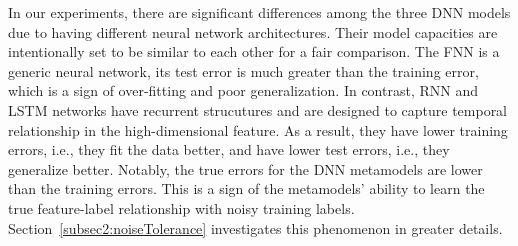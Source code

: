 In our experiments, there are significant differences among the three DNN models due to having different neural network architectures.
Their model capacities are intentionally set to be similar to each other for a fair comparison.
The FNN is a generic neural network, its test error is much greater than the training error, which is a sign of over-fitting and poor generalization.
In contrast, RNN and LSTM networks have recurrent strucutures and are designed to capture temporal relationship in the high-dimensional feature.
As a result, they have lower training errors, i.e., they fit the data better, and have lower test errors, i.e., they generalize better.
Notably, the true errors for the DNN metamodels are lower than the training errors.
This is a sign of the metamodels' ability to learn the true feature-label relationship with noisy training labels. 
Section~\ref{subsec2:noiseTolerance} investigates this phenomenon in greater details.

